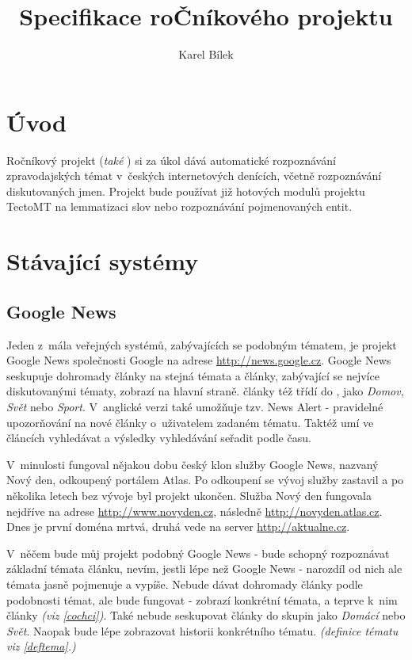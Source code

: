 \documentclass[12pt]{amsart}
\title{Specifikace roČníkového projektu}
\author{Karel Bílek}
\begin{document}
\maketitle

\tableofcontents

\section{Úvod}
Ročníkový projekt  (\emph{také }) si za úkol dává automatické rozpoznávání zpravodajských témat v~českých internetových denících, včetně rozpoznávání diskutovaných jmen. Projekt bude používat již hotových modulů projektu TectoMT na lemmatizaci slov nebo rozpoznávání pojmenovaných entit.

\section{Stávající systémy}
\subsection{Google News}
Jeden z~mála veřejných systémů, zabývajících se po\-dob\-ným tématem, je projekt Google News společnosti Google na adrese \url{http://news.google.cz}. Google News seskupuje dohromady články na stejná témata a články, zabývající se nejvíce diskutovanými tématy, zobrazí na hlavní straně. články též třídí do , jako \emph{Domov}, \emph{Svět} nebo \emph{Sport}. V~anglické verzi také umožňuje tzv. News Alert - pravidelné upozorňování na nové články o~uživatelem zadaném tématu. Taktéž umí ve článcích vyhledávat a výsledky vyhledávání seřadit podle času.

V~minulosti fungoval nějakou dobu český klon služby Google News, nazvaný Nový den, odkoupený portálem Atlas. Po odkoupení se vývoj služby zastavil a po několika letech bez vývoje byl projekt ukončen. Služba Nový den fungovala nejdříve na adrese \url{http://www.novyden.cz}, následně \url{http://novyden.atlas.cz}.  Dnes je první doména mrtvá, druhá vede na server \url{http://aktualne.cz}.

V~něčem bude můj projekt podobný Google News - bude schopný rozpoznávat základní témata článku, nevím, jestli lépe než Google News - narozdíl od nich ale témata jasně pojmenuje a vypíše. Nebude dávat dohromady články podle podobnosti témat, ale bude fungovat  - zobrazí konkrétní témata, a teprve k~nim články \emph{(viz \ref{cochci})}. Také nebude seskupovat články do skupin jako \emph{Domácí} nebo \emph{Svět}. Na\-o\-pak bude lépe zobrazovat historii konkrétního tématu. \emph{(definice tématu viz \ref{deftema}.)}
\end{document}
